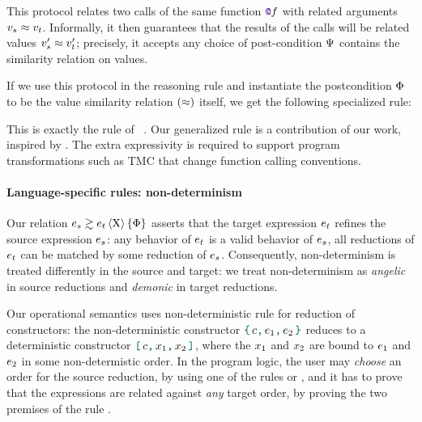 This protocol relates two calls of the same function $\datalangFnptr{\datalangFn}$
with related arguments $\datalangVal_s \iSimilar \datalangVal_t$. Informally, it then
guarantees that the results of the calls will be related values
$\datalangVal_s' \iSimilar \datalangVal_t'$; precisely, it accepts any choice of post-condition $\Psi$ contains the similarity relation on values.

If we use this protocol in the reasoning rule
 and instantiate the postcondition $\Phi$ to be the value similarity relation $(\approx)$ itself, we get the following specialized rule:
This is exactly the  rule of \Simuliris~\citep*{TODO-simuliris}. Our generalized rule  is a contribution of our work, inspired by \citet*{TODO-paulo}. The extra expressivity is required to support program transformations such as TMC that change function calling conventions.

\paragraph{Language-specific rules: non-determinism}
%
Our relation $\iSim[\iProt]{\iPred}{\datalangExpr_s}{\datalangExpr_t}$ asserts that the target expression $\datalangExpr_t$ refines the source expression $\datalangExpr_s$: any behavior of $\datalangExpr_t$ is a valid behavior of $\datalangExpr_s$, all reductions of $\datalangExpr_t$ can be matched by some reduction of $\datalangExpr_s$. Consequently, non-determinism is treated differently in the source and target: we treat non-determinism as \emph{angelic} in source reductions and \emph{demonic} in target reductions.

Our operational semantics uses non-deterministic rule for reduction of constructors: the non-deterministic constructor $\datalangBlock{c}{\datalangExpr_1}{\datalangExpr_2}$ reduces to a deterministic constructor $\datalangBlockDet{c}{\datalangVar_1}{\datalangVar_2}$, where the $\datalangVar_1$ and $\datalangVar_2$ are bound to $\datalangExpr_1$ and $\datalangExpr_2$ in some non-determistic order.
%
In the program logic, the user may \emph{choose} an order for the source reduction, by using one of the rules  or , and it has to prove that the expressions are related against \emph{any} target order, by proving the two premises of the rule .

